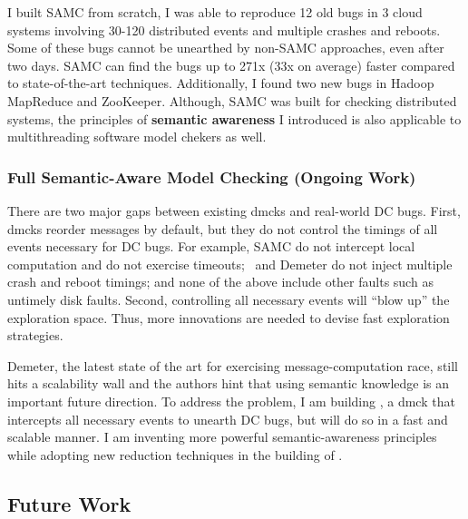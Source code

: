 \documentclass[11pt]{article}
\begin{document}
I built SAMC from scratch, I was able to reproduce 12 old bugs
in 3 cloud systems involving 30-120 distributed events and multiple crashes and
reboots. Some of these bugs cannot be unearthed by non-SAMC approaches, even
after two days. SAMC can find the bugs up to 271x (33x on average) faster
compared to state-of-the-art techniques. Additionally, I found two new bugs in
Hadoop MapReduce and ZooKeeper. Although, SAMC was built for checking
distributed systems, the principles of \textbf{semantic awareness} I
introduced is also applicable to multithreading software model chekers as well.

\subsubsection*{Full Semantic-Aware Model Checking (Ongoing Work)} 

There are two major gaps between existing dmcks and real-world
DC bugs. First, dmcks reorder messages by default, but they do not control the
timings of all events necessary for DC bugs. For example, 
SAMC do not intercept local computation and do not exercise timeouts;
\modist\ and Demeter do not inject multiple crash and reboot timings; and none
of the above include other faults such as untimely disk faults.
%
Second, controlling all necessary events will ``blow up'' the exploration space.
Thus, more innovations are needed to devise fast exploration strategies.


Demeter, the latest state of the art for exercising message-computation race,
still hits a scalability wall and the authors hint that using semantic knowledge
is an important future direction. To address the problem, I am building
\fullcheck, a dmck that intercepts all necessary events to unearth DC bugs, but
will do so in a fast and scalable manner. I am inventing more powerful
semantic-awareness principles while adopting new reduction techniques in the
building of \fullcheck.



\subsection{Future Work}
\end{document}
